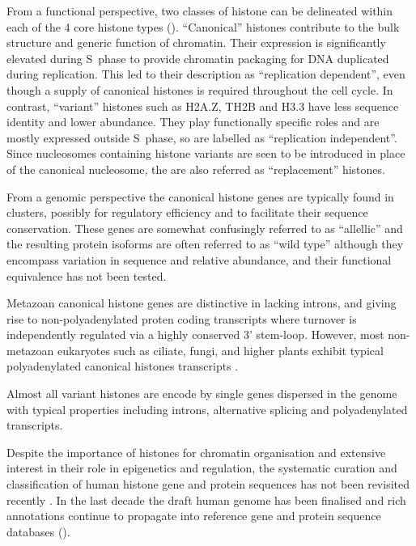   From a functional perspective, two classes of histone can be delineated 
  within each of the 4 core histone types (). 
  ``Canonical'' histones contribute to the bulk structure and generic function of chromatin. 
  Their expression is significantly elevated during S~phase to provide chromatin packaging 
  for DNA duplicated during replication. This led to their description as ``replication dependent'', 
  even though a supply of canonical histones is required throughout the cell cycle. 
  In contrast, ``variant'' histones such as H2A.Z, TH2B and H3.3 have less sequence identity and lower abundance. 
  They play functionally specific roles and are mostly expressed outside S~phase, 
  so are labelled as ``replication independent''. 
  Since nucleosomes containing histone variants are seen to be introduced in place of the canonical nucleosome, 
  the are also referred as ``replacement'' histones.
  
  From a genomic perspective the canonical histone genes are typically found in  clusters, 
  possibly for regulatory efficiency and to facilitate their sequence conservation. 
  These genes are somewhat confusingly referred to as ``allellic'' 
  and the resulting protein isoforms are often referred to as ``wild type'' 
  although they encompass variation in sequence and relative abundance, 
  and their functional equivalence has not been tested.
  
  Metazoan canonical histone genes are distinctive in lacking introns, 
  and giving rise to non-polyadenylated proten coding transcripts 
  where turnover is independently regulated via a highly conserved 3' stem-loop. 
  However, most non-metazoan eukaryotes such as ciliate, fungi, and higher plants 
  exhibit typical polyadenylated canonical histones transcripts \addref{}.

  Almost all variant histones are encode by single genes dispersed in the genome 
  with typical properties including introns, alternative splicing and polyadenylated transcripts.
  

  Despite the importance of histones for chromatin organisation and extensive interest
  in their role in epigenetics and regulation, the systematic curation and classification of human histone
  gene and protein sequences has not been revisited recently \citep{Marzluff02}.
  In the last decade the draft human genome has been finalised 
  and rich annotations continue to propagate into reference gene and protein sequence databases ().

